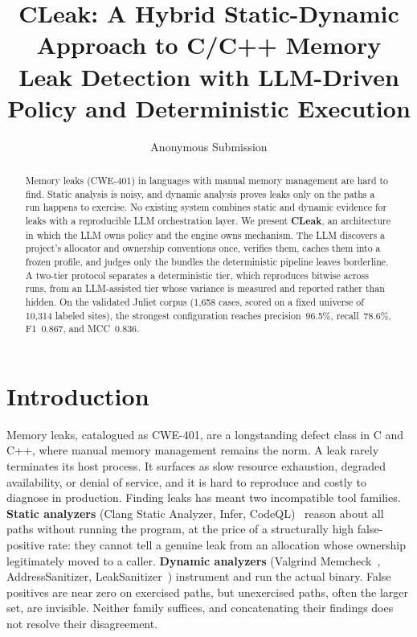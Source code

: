 \documentclass[a4paper]{llncs}
\title{CLeak: A Hybrid Static-Dynamic Approach to C/C++ Memory Leak Detection with LLM-Driven Policy and Deterministic Execution}
\author{Anonymous Submission}
\institute{}
\begin{document}
\maketitle

\begin{abstract}
Memory leaks (CWE-401) in languages with manual memory management are hard
to find. Static analysis is noisy, and dynamic analysis proves leaks only on
the paths a run happens to exercise. No existing system combines static and
dynamic evidence for leaks with a reproducible LLM orchestration layer. We
present \textbf{CLeak}, an architecture in which the LLM owns policy and the
engine owns mechanism. The LLM discovers a project's allocator and ownership
conventions once, verifies them, caches them into a frozen profile, and judges
only the bundles the deterministic pipeline leaves borderline. A two-tier
protocol separates a deterministic tier, which reproduces bitwise across
runs, from an LLM-assisted tier whose variance is measured and reported
rather than hidden. On the validated Juliet corpus (1{,}658 cases, scored on
a fixed universe of 10{,}314 labeled sites), the strongest configuration
reaches precision~96.5\%, recall~78.6\%, F1~0.867, and MCC~0.836.
\end{abstract}

\section{Introduction}
\label{sec:intro}

Memory leaks, catalogued as CWE-401, are a longstanding defect class
in C and C++, where manual memory management remains the norm. A leak
rarely terminates its host process. It surfaces as slow resource
exhaustion, degraded availability, or denial of service, and it is hard
to reproduce and costly to diagnose in production. Finding leaks has
meant two incompatible tool families.
\textbf{Static analyzers} (Clang Static Analyzer, Infer, CodeQL)~\cite{clangsa,infer,codeql} reason
about all paths without running the program, at the price of a
structurally high false-positive rate: they cannot tell a genuine leak
from an allocation whose ownership legitimately moved to a caller.
\textbf{Dynamic analyzers} (Valgrind Memcheck~\cite{valgrind}, AddressSanitizer,
LeakSanitizer~\cite{asan}) instrument and run the actual binary. False
positives are near zero on exercised paths, but unexercised paths, often
the larger set, are invisible. Neither family suffices, and
concatenating their findings does not resolve their disagreement.
\end{document}
